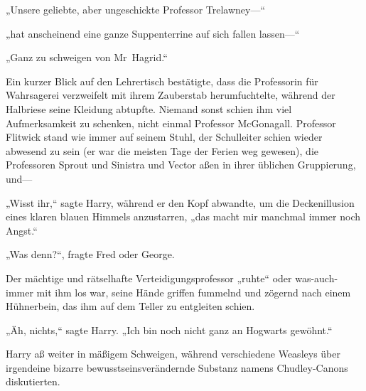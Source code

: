 „Unsere geliebte, aber ungeschickte Professor Trelawney—“

„hat anscheinend eine ganze Suppenterrine auf sich fallen lassen—“

„Ganz zu schweigen von Mr~Hagrid.“

Ein kurzer Blick auf den Lehrertisch bestätigte, dass die Professorin für Wahrsagerei verzweifelt mit ihrem Zauberstab herumfuchtelte, während der Halbriese seine Kleidung abtupfte. Niemand sonst schien ihm viel Aufmerksamkeit zu schenken, nicht einmal Professor McGonagall. Professor Flitwick stand wie immer auf seinem Stuhl, der Schulleiter schien wieder abwesend zu sein (er war die meisten Tage der Ferien weg gewesen), die Professoren Sprout und Sinistra und Vector aßen in ihrer üblichen Gruppierung, und—

„Wisst ihr,“ sagte Harry, während er den Kopf abwandte, um die Deckenillusion eines klaren blauen Himmels anzustarren, „das macht mir manchmal immer noch Angst.“

„Was denn?“, fragte Fred oder George.

Der mächtige und rätselhafte Verteidigungsprofessor „ruhte“ oder was-auch-immer mit ihm los war, seine Hände griffen fummelnd und zögernd nach einem Hühnerbein, das ihm auf dem Teller zu entgleiten schien.

„Äh, nichts,“ sagte Harry. „Ich bin noch nicht ganz an Hogwarts gewöhnt.“

Harry aß weiter in mäßigem Schweigen, während verschiedene Weasleys über irgendeine bizarre bewusstseinsverändernde Substanz namens Chudley-Canons diskutierten.

